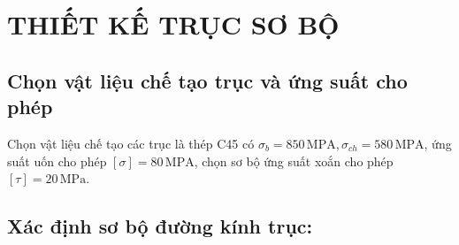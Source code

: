     \section{THIẾT KẾ TRỤC SƠ BỘ}
        \subsection{Chọn vật liệu chế tạo trục và ứng suất cho phép}
            \hspace*{0.6cm}Chọn vật liệu chế tạo các trục là thép C45 có $\sigma_{b} = 850 \, \mathrm{MPA}, \sigma_{ch} = 580 \, \mathrm{MPA}$, ứng suất uốn cho phép $[\sigma] = 80 \, \mathrm{MPA}$, chọn sơ bộ ứng suất xoắn cho phép $[\tau] = 20 \, \mathrm{MPa}$. 
        
        \subsection{Xác định sơ bộ đường kính trục:}
